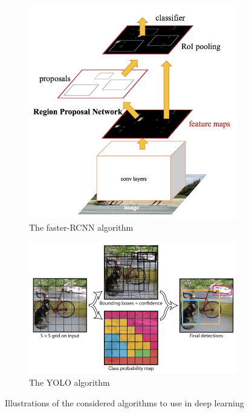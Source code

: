 \documentclass[../Head/Main.tex]{subfiles}
\begin{document}
\begin{figure}[H]
    \centering
    \begin{subfigure}[t]{.30\textwidth}
        \centering
        \includegraphics[width=\textwidth]{../Figures/deep_learning_algorithms/faster_rcnn.png}
        \caption{The faster-RCNN algorithm \cite{FasterRCNN}}
        \label{fig:faster_rcnn}
    \end{subfigure}
        \begin{subfigure}[t]{.43\textwidth}
        \centering
        \includegraphics[width=\textwidth]{../Figures/deep_learning_algorithms/yolo.png}
        \caption{The YOLO algorithm\cite{prosConsDeepLearning}}
        \label{fig:yolo}
    \end{subfigure}
    \caption{Illustrations of the considered algorithms to use in deep learning}
     \label{fig:considered_algorihtms_deep_learning}
\end{figure}
\end{document}

